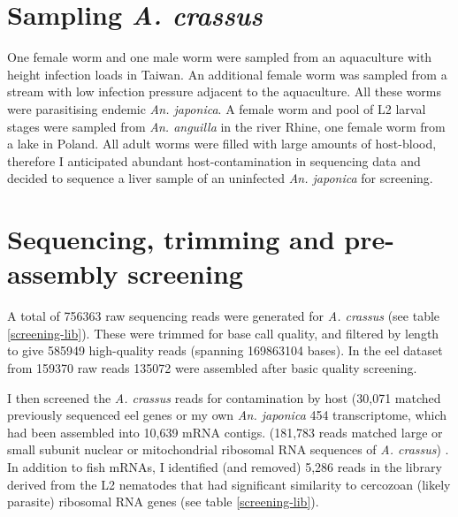\section{Sampling \textit{A. crassus}}

One female worm and one male worm were sampled from an aquaculture
with height infection loads in Taiwan. An additional female worm was
sampled from a stream with low infection pressure adjacent to the
aquaculture. All these worms were parasitising endemic
\textit{An. japonica}. A female worm and pool of L2 larval stages were
sampled from \textit{An. anguilla} in the river Rhine, one female worm
from a lake in Poland. All adult worms were filled with large amounts
of host-blood, therefore I anticipated abundant host-contamination in
sequencing data and decided to sequence a liver sample of an
uninfected \textit{An. japonica} for screening.

\section{Sequencing, trimming and pre-assembly screening}

A total of 756363 raw sequencing reads were generated for
\textit{A. crassus} (see table \ref{screening-lib}). These were
trimmed for base call quality, and filtered by length to give 585949
high-quality reads (spanning 169863104 bases). In the eel dataset from
159370 raw reads 135072 were assembled after basic quality screening.

I then screened the \textit{A. crassus} reads for contamination by
host (30,071 matched previously sequenced eel genes or my own
\textit{An. japonica} 454 transcriptome, which had been assembled into
10,639 mRNA contigs. (181,783 reads matched large or small subunit
nuclear or mitochondrial ribosomal RNA sequences of
\textit{A. crassus}) . In addition to fish mRNAs, I identified (and
removed) 5,286 reads in the library derived from the L2 nematodes that
had significant similarity to cercozoan (likely parasite) ribosomal
RNA genes (see table \ref{screening-lib}).

